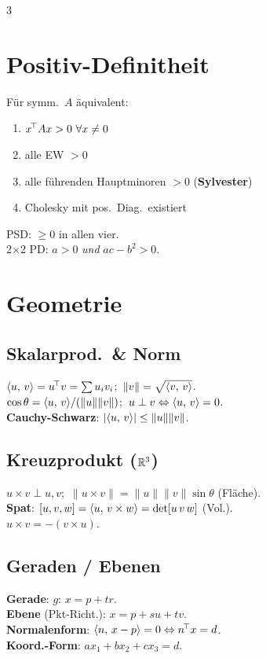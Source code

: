 \documentclass[8pt,a4paper]{extarticle}
\begin{document}
\begin{multicols*}{3}
\section{Positiv-Definitheit}
F\"ur symm.\ $A$ \"aquivalent:
\begin{enumerate}
\item $x^{\!\top} Ax>0\ \forall x\ne 0$
\item alle EW $>0$
\item alle f\"uhrenden Hauptminoren $>0$ (\textbf{Sylvester})
\item Cholesky mit pos.\ Diag.\ existiert
\end{enumerate}
PSD: $\ge 0$ in allen vier.\\
2$\times$2 PD: $a>0$ \emph{und} $ac-b^2>0$.

\section{Geometrie}
\subsection{Skalarprod.\ \& Norm}
$\langle u,\,v\rangle=u^{\!\top} v=\sum u_iv_i$;\ $\|v\|=\sqrt{\langle v,\,v\rangle}$.\\
$\cos\theta=\langle u,\,v\rangle/(\|u\|\|v\|)$;\ $u\perp v\Leftrightarrow\langle u,\,v\rangle=0$.\\
\textbf{Cauchy-Schwarz}: $|\langle u,\,v\rangle|\le\|u\|\|v\|$.

\subsection{Kreuzprodukt ($\mathbb{R}^3$)}
$u\times v\perp u,v$;\ $\|u\times v\|=\|u\|\|v\|\sin\theta$ (Fl\"ache).\\
\textbf{Spat}: $[u,v,w]=\langle u,\,v\times w\rangle=\det[u\,v\,w]$ (Vol.).\\
$u\times v=-(v\times u)$.

\subsection{Geraden / Ebenen}
\textbf{Gerade}: $g:\,x=p+tr$.\\
\textbf{Ebene} (Pkt-Richt.): $x=p+su+tv$.\\
\textbf{Normalenform}: $\langle n,\,x-p\rangle=0\Leftrightarrow n^{\!\top} x=d$.\\
\textbf{Koord.-Form}: $ax_1+bx_2+cx_3=d$.


\end{multicols*}
\end{document}
